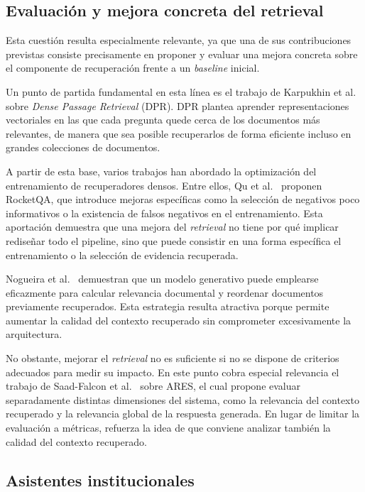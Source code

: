 \subsection{Evaluación y mejora concreta del retrieval}

Esta cuestión resulta especialmente relevante, ya que una de sus contribuciones previstas consiste precisamente en proponer y evaluar una mejora concreta sobre el componente de recuperación frente a un \textit{baseline} inicial.

Un punto de partida fundamental en esta línea es el trabajo de Karpukhin et al.\ \cite{karpukhin2020dpr} sobre \textit{Dense Passage Retrieval} (DPR). 
DPR plantea aprender representaciones vectoriales en las que cada pregunta quede cerca de los documentos más relevantes, de manera que sea posible recuperarlos de forma eficiente incluso en grandes colecciones de documentos.

A partir de esta base, varios trabajos han abordado la optimización del entrenamiento de recuperadores densos. 
Entre ellos, Qu et al.\ \cite{qu2021rocketqa} proponen RocketQA, que introduce mejoras específicas como la selección de negativos poco informativos o la existencia de falsos negativos en el entrenamiento. 
Esta aportación demuestra que una mejora del \textit{retrieval} no tiene por qué implicar rediseñar todo el pipeline, sino que puede consistir en una forma específica el entrenamiento o la selección de evidencia recuperada.

Nogueira et al.\ \cite{nogueira2020monot5} demuestran que un modelo generativo puede emplearse eficazmente para calcular relevancia documental y reordenar documentos previamente recuperados. 
Esta estrategia resulta atractiva porque permite aumentar la calidad del contexto recuperado sin comprometer excesivamente la arquitectura.

No obstante, mejorar el \textit{retrieval} no es suficiente si no se dispone de criterios adecuados para medir su impacto. 
En este punto cobra especial relevancia el trabajo de Saad-Falcon et al.\ \cite{saadfalcon2024ares} sobre ARES, el cual propone evaluar separadamente distintas dimensiones del sistema, como la relevancia del contexto recuperado y la relevancia global de la respuesta generada. 
En lugar de limitar la evaluación a métricas, refuerza la idea de que conviene analizar también la calidad del contexto recuperado.

\subsection{Asistentes institucionales}

